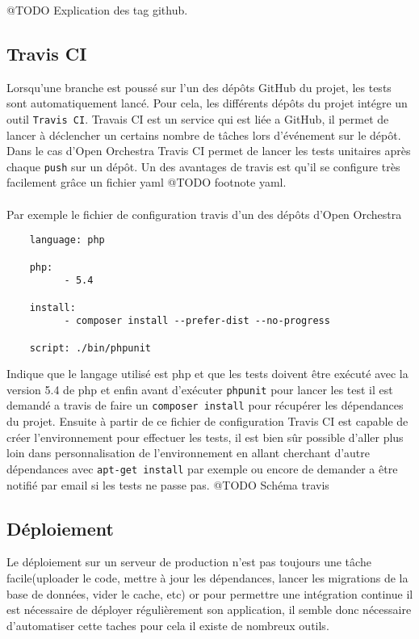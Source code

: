 @TODO  Explication des tag github.
\subsection{Travis CI}
Lorsqu'une branche est poussé sur l'un des dépôts GitHub du projet, les tests sont automatiquement lancé. Pour cela, les différents dépôts du projet intégre un outil \verb?Travis CI?. Travais CI est un service qui est liée a GitHub, il permet de lancer à déclencher un certains nombre de tâches lors d'événement sur le dépôt. Dans le cas d'Open Orchestra Travis CI permet de lancer les tests unitaires après chaque \verb?push? sur un dépôt. Un des avantages de travis est qu'il se configure très facilement grâce un fichier yaml @TODO footnote yaml.
\paragraph{}
Par exemple le fichier de configuration travis d'un des dépôts d'Open Orchestra 
\begin{verbatim}
    language: php

    php:
          - 5.4

    install:
          - composer install --prefer-dist --no-progress
 
    script: ./bin/phpunit
\end{verbatim}

Indique que le langage utilisé est php et que les tests doivent être exécuté avec la version 5.4 de php et enfin avant d'exécuter \verb?phpunit? pour lancer les test il est demandé a travis de faire un \verb?composer install? pour récupérer les dépendances du projet.  Ensuite à partir de ce fichier de configuration Travis CI est capable de créer l'environnement pour effectuer les tests, il est bien sûr possible d'aller plus loin dans  personnalisation de l'environnement en allant cherchant d'autre dépendances avec \verb?apt-get install? par exemple ou encore de demander a être notifié par email si les tests ne passe pas.
@TODO Schéma travis
\subsection{Déploiement}
Le déploiement sur un serveur de production n'est pas toujours une tâche facile(uploader le code, mettre à jour les dépendances, lancer les migrations de la base de données, vider le cache, etc)  or pour permettre une intégration continue il est nécessaire de déployer régulièrement son application, il semble donc nécessaire d'automatiser cette taches pour cela il existe de nombreux outils. 
